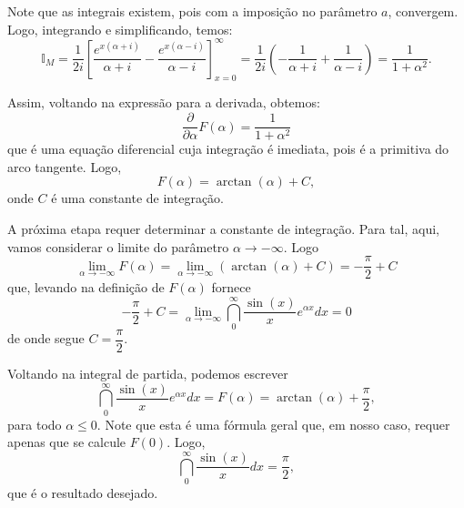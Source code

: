 {Note que as integrais existem, pois com a imposição no parâmetro $a$, convergem. Logo, integrando e simplificando, temos:
$$
\mathbb{I}_M =
\dfrac{1}{2i}
\left[
\dfrac{e^{x(\alpha+i)}}{\alpha+i} - \dfrac{e^{x(\alpha-i)}}{\alpha-i}
\right]_{x=0}^{\infty}
=
\dfrac{1}{2i}
\left(-\dfrac{1}{\alpha+i} + \dfrac{1}{\alpha-i}\right)
=
\dfrac{1}{1+\alpha^{2}}.
$$

Assim, voltando na expressão para a derivada, obtemos:
$$\dfrac{\partial }{\partial \alpha} F(\alpha) = \dfrac{1}{1+\alpha^{2}}$$
que é uma equação diferencial cuja integração é imediata, pois é a primitiva do arco tangente. Logo,
$$F(\alpha) = \arctan(\alpha) + C,$$
onde $C$ é uma constante de integração.

A próxima etapa requer determinar a constante de integração. Para tal, aqui, vamos considerar o limite do parâmetro $\alpha \to -\infty$. Logo
$$\displaystyle\lim_{\alpha\to-\infty} F(\alpha) = \lim_{\alpha\to-\infty} (\arctan(\alpha) + C) = -\dfrac{\pi}{2} + C$$
que, levando na definição de $F(\alpha)$ fornece
$$-\dfrac{\pi}{2} + C = \lim_{\alpha\to-\infty}
\dint_{0}^{\infty} \dfrac{\sin(x)}{x} e^{\alpha x} dx = 0$$
de onde segue $C = \dfrac{\pi}{2}$.

Voltando na integral de partida, podemos escrever
$$\dint_{0}^{\infty} \dfrac{\sin(x)}{x} e^{\alpha x} dx = F(\alpha) = \arctan(\alpha) + \dfrac{\pi}{2},$$
para todo $\alpha \leq 0$. Note que esta é uma fórmula geral que, em nosso caso, requer apenas que se calcule $F(0)$. Logo,
$$\dint_{0}^{\infty} \dfrac{\sin(x)}{x} dx = \dfrac{\pi}{2},$$
que é o resultado desejado.
}




